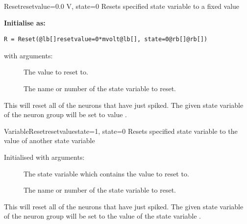 \documentclass[letterpaper,10pt]{manual}
\begin{document}
\hypertarget{brian.Reset}{}\begin{classdesc}{Reset}{resetvalue=0.0 V, state=0}
Resets specified state variable to a fixed value

\textbf{Initialise as:}

\begin{Verbatim}[commandchars=@\[\]]
R = Reset(@lb[]resetvalue=0*mvolt@lb[], state=0@rb[]@rb[])
\end{Verbatim}

with arguments:
\begin{description}
\item[]
The value to reset to.

\item[]
The name or number of the state variable to reset.

\end{description}

This will reset all of the neurons that have just spiked. The
given state variable of the neuron group will be set to value
.
\end{classdesc}

\hypertarget{brian.VariableReset}{}\begin{classdesc}{VariableReset}{resetvaluestate=1, state=0}
Resets specified state variable to the value of another state variable

Initialised with arguments:
\begin{description}
\item[]
The state variable which contains the value to reset to.

\item[]
The name or number of the state variable to reset.

\end{description}

This will reset all of the neurons that have just spiked. The
given state variable of the neuron group will be set to
the value of the state variable .
\end{classdesc}
\end{document}
